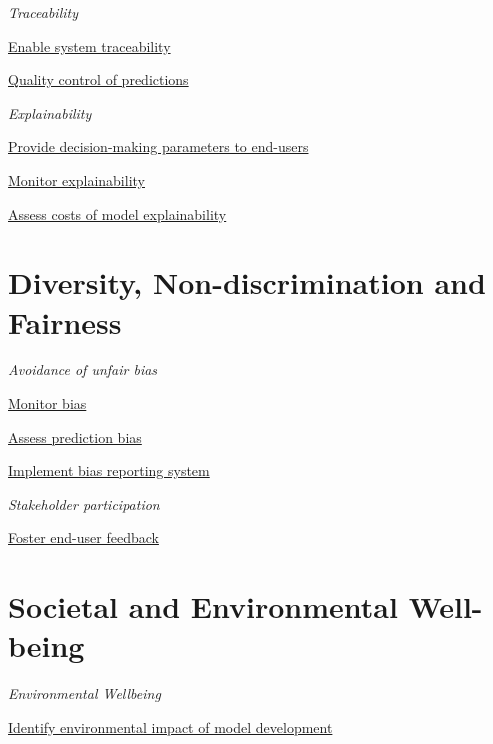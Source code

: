 \documentclass[
  letterpaper,
  DIV=11,
  numbers=noendperiod]{scrreport}
\begin{document}

\emph{Traceability}

\protect\hyperlink{enable-system-traceability}{Enable system
traceability}

\protect\hyperlink{quality-control-of-predictions}{Quality control of
predictions}

\emph{Explainability}

\protect\hyperlink{provide-decision-making-parameters-to-end-users}{Provide
decision-making parameters to end-users}

\protect\hyperlink{monitor-explainability}{Monitor explainability}

\protect\hyperlink{assess-costs-of-model-explainability}{Assess costs of
model explainability}

\hypertarget{diversity-non-discrimination-and-fairness-1}{%
\section*{Diversity, Non-discrimination and
Fairness}\label{diversity-non-discrimination-and-fairness-1}}


\emph{Avoidance of unfair bias}

\protect\hyperlink{monitor-bias}{Monitor bias}

\protect\hyperlink{assess-prediction-bias}{Assess prediction bias}

\protect\hyperlink{implement-bias-reporting-system}{Implement bias
reporting system}

\emph{Stakeholder participation}

\protect\hyperlink{foster-end-user-feedback}{Foster end-user feedback}

\hypertarget{societal-and-environmental-well-being-1}{%
\section*{Societal and Environmental
Well-being}\label{societal-and-environmental-well-being-1}}


\emph{Environmental Wellbeing}

\protect\hyperlink{identify-environmental-impact-of-model-development}{Identify
environmental impact of model development}
\end{document}
